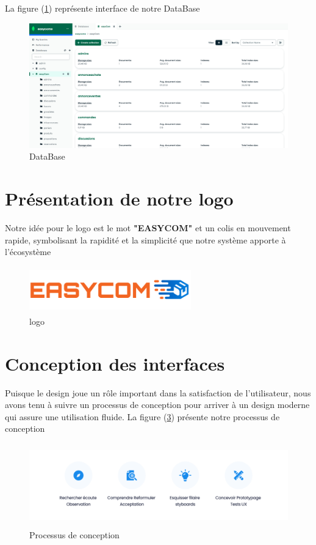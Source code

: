 \documentclass[edit,12pt,a4paper,ChapStyle,oneside,doubleinterligne]{report}
\begin{document}
\newpage
La figure (\ref{fig:db}) représente interface de notre DataBase 
\begin{figure} [H]
    \centering
    \includegraphics[width=1\textwidth]{images/easycomdb.png}
    \caption{DataBase}
    \label{fig:db}
\end{figure}
\section{Présentation de notre logo}
Notre idée pour le logo est le mot \textbf{"EASYCOM"} et un colis en mouvement rapide, symbolisant la rapidité et la simplicité que notre système apporte à l'écosystème
\begin{figure}[H] 
    \centering
    \includegraphics[width=7cm , height = 2cm , angle=360]{images/logo.png}
    \caption{logo}
    \label{fig:logo}
\end{figure}
\section{Conception des interfaces }
Puisque le design joue un rôle important dans la satisfaction de l'utilisateur, nous avons tenu à suivre un processus de conception pour arriver à un design moderne qui assure une utilisation fluide.
 La figure (\ref{fig:processe}) présente notre processus de conception
 
  \begin{figure} [H]
    \centering
    \includegraphics[width=13.335cm , height = 3.59cm , angle=360]{images/processe.png}
    \caption{Processus de conception}
    \label{fig:processe}
\end{figure}
\end{document}

